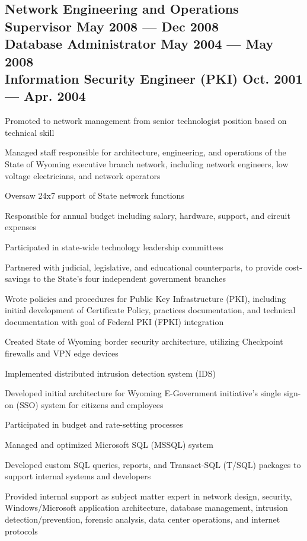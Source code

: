\documentclass[letter,10pt]{article}
\begin{document}
\subsection{Network Engineering and Operations Supervisor \hfill May 2008 --- Dec 2008\\
	Database Administrator \hfill May 2004 --- May 2008\\
	Information Security Engineer (PKI) \hfill Oct. 2001 --- Apr. 2004}
\begin{zitemize}
	\item Promoted to network management from senior technologist
	position based on technical skill
	\item Managed staff responsible for architecture, engineering,
	and operations of the State of Wyoming executive branch
	network, including network engineers, low voltage
	electricians, and network operators
	\item Oversaw 24x7 support of State network functions
	\item Responsible for annual budget including salary, hardware,
	support, and circuit expenses
	\item Participated in state-wide technology leadership committees
	\item Partnered with judicial, legislative, and educational
	counterparts, to provide cost-savings to the State's
	four independent government branches
	\item Wrote policies and procedures for Public Key
	Infrastructure (PKI), including initial development of
	Certificate Policy, practices documentation, and
	technical documentation with goal of Federal PKI (FPKI)
	integration
	\item Created State of Wyoming border security architecture,
	utilizing Checkpoint firewalls and VPN edge devices
	\item Implemented distributed intrusion detection system (IDS)
	\item Developed initial architecture for Wyoming E-Government
	initiative's single sign-on (SSO) system for citizens and
	employees
	\item Participated in budget and rate-setting processes
	\item Managed and optimized Microsoft SQL (MSSQL) system
	\item Developed custom SQL queries, reports, and Transact-SQL
	(T/SQL) packages to support internal systems and
	developers
	\item Provided internal support as subject matter expert in
	network design, security, Windows/Microsoft application
	architecture, database management, intrusion
	detection/prevention, forensic analysis, data center
	operations, and internet protocols
\end{zitemize}
\end{document}
